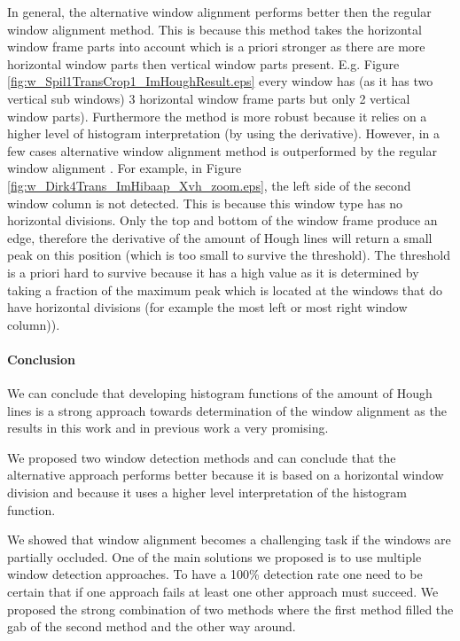 In general, the alternative window alignment performs better then the regular
window alignment method.  This is because this method takes the  horizontal
window frame parts into account which is a priori stronger as there are more
horizontal window parts then vertical window parts present.  E.g. Figure
\ref{fig:w_Spil1TransCrop1_ImHoughResult.eps} every window has (as it has two
vertical sub windows) 3 horizontal window frame parts but only 2 vertical window
parts).  Furthermore the method is more robust because it relies on a higher
level of histogram interpretation (by using the derivative).  However, in a few
cases alternative window alignment method is outperformed by the regular window
alignment . For example, in Figure
\ref{fig:w_Dirk4Trans_ImHibaap_Xvh_zoom.eps}, the left
side of the second window column is not detected.
This is because this window type has no horizontal divisions. Only the top and
bottom of the window frame produce an edge, therefore the derivative of the
amount of Hough lines will return a small peak on this position (which is too
small to survive the threshold).  
The threshold is a priori hard to survive because it has a high value as it is
determined by taking a fraction of the maximum peak which is located at the
windows that do have horizontal divisions (for example the most left or most
right window column)). 



\paragraph{Conclusion}
We can conclude that developing histogram functions of the amount of Hough lines
is a strong approach towards determination of the window alignment as the
results in this work and in previous work a very promising.

We proposed two window detection methods and can conclude that the alternative
approach performs better because it is based on a horizontal window division and
because it uses a higher level interpretation of the histogram function.

We showed that window alignment becomes a challenging task if the windows are partially
occluded.  One of the main solutions we proposed is to use multiple window
detection approaches.  To have a 100\% detection rate one need to be certain
that if one approach fails at least one other approach must succeed.  We
proposed the strong combination of two methods where the first method filled the
gab of the second method and the other way around.


